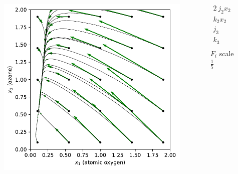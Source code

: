 \begin{columns}
\begin{column}{0.65\textwidth}
\vspace{-0.35in}
\begin{figure}
\includegraphics[scale=0.65]{../Plots/chapman_fast.pdf}
\end{figure}
\end{column}
\begin{column}{0.35\textwidth}
\vspace{-0.35in}
\begin{align*}
2 \ j_2 x_2 &= 0.1 \\
k_2 x_2 &= 2.0 \\
j_3 &= 0.3 \\
k_3 &= 0.5 \\
\end{align*}
\hspace{0.4in} $F_i$ scale $\frac{1}{5}$
\end{column}
\end{columns}
